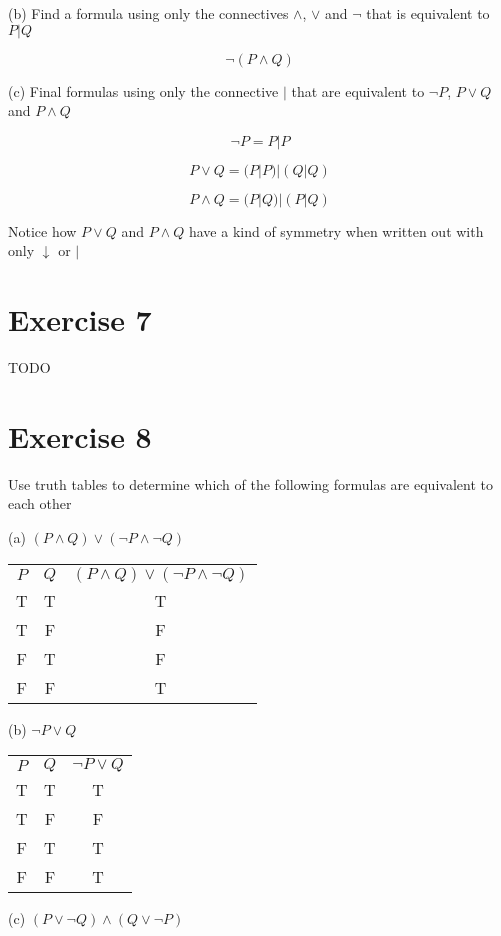 \documentclass[11pt]{article}
\begin{document}
\noindent (b) Find a formula using only the connectives $\wedge$, $\vee$ and $\neg$ that is equivalent to $P | Q$

$$\neg (P \wedge Q)$$

\noindent (c) Final formulas using only the connective $|$ that are equivalent to $\neg P$, $P \vee Q$ and $P \wedge Q$

$$\neg P = P|P$$

$$P \vee Q = (P | P) | (Q | Q)$$

$$P \wedge Q = (P | Q) | (P | Q)$$

Notice how $P \vee Q$ and $P \wedge Q$ have a kind of symmetry when written out with only $\downarrow$ or $|$

\section*{Exercise 7}

TODO

\section*{Exercise 8}

Use truth tables to determine which of the following formulas are equivalent to each other

\noindent (a) $(P \wedge Q) \vee (\neg P \wedge \neg Q)$

\begin{center}
\begin{tabular}{ c c c }
 $P$ & $Q$ & $(P \wedge Q) \vee (\neg P \wedge \neg Q)$\\ 
T & T & T\\  
T & F & F\\
F & T & F\\  
F & F & T
\end{tabular}
\end{center}

\noindent (b) $\neg P \vee Q$

\begin{center}
\begin{tabular}{ c c c }
 $P$ & $Q$ & $\neg P \vee Q$\\ 
T & T & T\\  
T & F & F\\
F & T & T\\  
F & F & T
\end{tabular}
\end{center}

\noindent (c) $(P \vee \neg Q) \wedge (Q \vee \neg P)$
\end{document}
